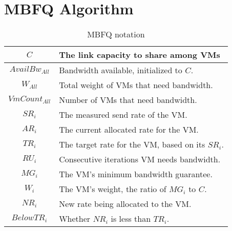 \section{MBFQ Algorithm}
\label{sec:algorithm}

\begin{table}[t]
{\footnotesize
\begin{tabular}{ | c | p{6cm} | }
  \hline
  $C$ & The link capacity to share among VMs \\ \hline
  $AvailBw_{All}$ & Bandwidth available, initialized to $C$. \\ \hline
  $W_{All}$ & Total weight of VMs that need bandwidth. \\ \hline
  $VmCount_{All}$ & Number of VMs that need bandwidth. \\ \hline 
  $SR_{i}$ & The measured send rate of the VM. \\ \hline
  $AR_{i}$ & The current allocated rate for the VM. \\ \hline
  $TR_{i}$ & The target rate for the VM, based on its $SR_{i}$. \\ \hline
  $RU_{i}$ & Consecutive iterations VM needs bandwidth. \\ \hline
  $MG_{i}$ & The VM's minimum bandwidth guarantee. \\ \hline
  $W_{i}$ & The VM's weight, the ratio of $MG_{i}$ to $C$. \\ \hline
  $NR_{i}$ & New rate being allocated to the VM.   \\ \hline
  $BelowTR_{i}$ & Whether $NR_{i}$ is less than $TR_{i}$. \\ \hline
\end{tabular}
}
\vspace{-1em}
\caption{MBFQ notation}
\vspace{-1em}
\label{tab:mbfq_init}
\end{table}


